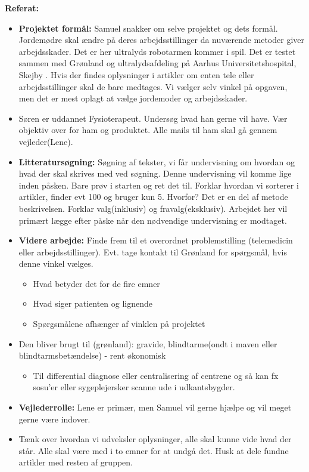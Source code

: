 \textbf{Referat:}
\begin{itemize}
	\item \textbf{Projektet formål:} Samuel snakker om selve projektet og dets formål. Jordemødre skal ændre på deres arbejdsstillinger da nuværende metoder giver arbejdsskader. Det er her ultralyds robotarmen kommer i spil.
	Det er testet sammen med Grønland og ultralydsafdeling på Aarhus Universitetshospital, Skejby . Hvis der findes oplysninger i artikler om enten tele eller arbejdsstillinger skal de bare medtages. Vi vælger selv vinkel på opgaven, men det er mest oplagt at vælge jordemoder og arbejdsskader.
	\item Søren er uddannet Fysioterapeut. Undersøg hvad han gerne vil have. Vær objektiv over for ham og produktet.  Alle mails til ham skal gå gennem vejleder(Lene). 
	\item \textbf{Litteratursøgning:} Søgning af tekster, vi får undervisning om hvordan og hvad der skal skrives med ved søgning. Denne undervisning vil komme lige inden påsken. Bare prøv i starten og ret det til. 
	Forklar hvordan vi sorterer i artikler, finder evt 100 og bruger kun 5. Hvorfor? Det er en del af metode beskrivelsen. Forklar valg(inklusiv) og fravalg(eksklusiv). Arbejdet her vil primært lægge efter påske når den nødvendige undervisning er modtaget.
	\item \textbf{Videre arbejde:} Finde frem til et overordnet problemstilling (telemedicin eller arbejdsstillinger). Evt. tage kontakt til Grønland for spørgsmål, hvis denne vinkel vælges. 
	\begin{itemize}
		\item Hvad betyder det for de fire emner
		\item Hvad siger patienten og lignende 
		\item Spørgsmålene afhænger af vinklen på projektet
	\end{itemize}   
	\item Den bliver brugt til (grønland): gravide, blindtarme(ondt i maven eller blindtarmsbetændelse) - rent økonomisk 
	\begin{itemize}
		\item Til differential diagnose eller centralisering af centrene og så kan fx sosu'er eller sygeplejersker scanne ude i udkantsbygder.
	\end{itemize} 
	\item \textbf{Vejlederrolle:} Lene er primær, men Samuel vil gerne hjælpe og vil meget gerne være indover. 
	\item Tænk over hvordan vi udveksler oplysninger,  alle skal kunne vide hvad der står. Alle skal være med i to emner for at undgå det. Husk at dele fundne artikler med resten af gruppen. 

\end{itemize}
